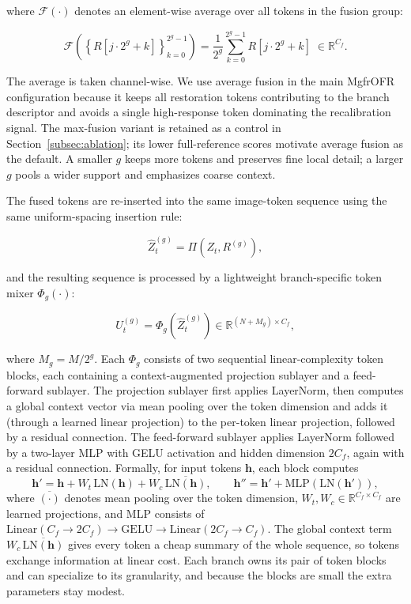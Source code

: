 \documentclass[symmetry,article,submit,pdftex,moreauthors]{Definitions/mdpi}
\begin{document}
where $\mathcal{F}(\cdot)$ denotes an element-wise average over all tokens in the fusion group:

\begin{equation}
\mathcal{F}\!\left(
\left\{R[j\cdot2^g+k]\right\}_{k=0}^{2^g-1}
\right)
= \frac{1}{2^g}\sum_{k=0}^{2^g-1} R[j\cdot2^g+k]\;\in\mathbb{R}^{C_f}.
\label{eq:avg_fusion}
\end{equation}

The average is taken channel-wise. We use average fusion in the main MgfrOFR configuration because it keeps all restoration tokens contributing to the branch descriptor and avoids a single high-response token dominating the recalibration signal. The max-fusion variant is retained as a control in Section~\ref{subsec:ablation}; its lower full-reference scores motivate average fusion as the default. A smaller $g$ keeps more tokens and preserves fine local detail; a larger $g$ pools a wider support and emphasizes coarse context.

The fused tokens are re-inserted into the same image-token sequence using the same uniform-spacing insertion rule:

\begin{equation}
\widehat{Z}_t^{(g)} = \Pi\!\left(Z_t,R^{(g)}\right),
\end{equation}

and the resulting sequence is processed by a lightweight branch-specific token mixer $\Phi_g(\cdot)$:

\begin{equation}
U_t^{(g)} = \Phi_g\!\left(\widehat{Z}_t^{(g)}\right)
\in \mathbb{R}^{(N+M_g)\times C_f},
\end{equation}

where $M_g = M/2^g$. Each $\Phi_g$ consists of two sequential linear-complexity token blocks, each containing a context-augmented projection sublayer and a feed-forward sublayer. The projection sublayer first applies LayerNorm, then computes a global context vector via mean pooling over the token dimension and adds it (through a learned linear projection) to the per-token linear projection, followed by a residual connection. The feed-forward sublayer applies LayerNorm followed by a two-layer MLP with GELU activation and hidden dimension $2C_f$, again with a residual connection. Formally, for input tokens $\mathbf{h}$, each block computes
\begin{equation}
\mathbf{h}' = \mathbf{h} + W_t\,\mathrm{LN}(\mathbf{h}) + W_c\,\overline{\mathrm{LN}(\mathbf{h})},\qquad
\mathbf{h}'' = \mathbf{h}' + \mathrm{MLP}(\mathrm{LN}(\mathbf{h}')),
\end{equation}
where $\overline{(\cdot)}$ denotes mean pooling over the token dimension, $W_t,W_c\in\mathbb{R}^{C_f\times C_f}$ are learned projections, and MLP consists of $\mathrm{Linear}(C_f\!\rightarrow\!2C_f)\!\rightarrow\!\mathrm{GELU}\!\rightarrow\!\mathrm{Linear}(2C_f\!\rightarrow\!C_f)$. The global context term $W_c\,\overline{\mathrm{LN}(\mathbf{h})}$ gives every token a cheap summary of the whole sequence, so tokens exchange information at linear cost. Each branch owns its pair of token blocks and can specialize to its granularity, and because the blocks are small the extra parameters stay modest.
\end{document}

